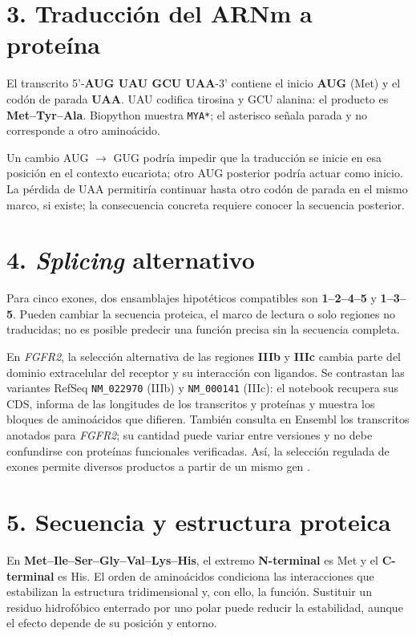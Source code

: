 \documentclass[10pt,a4paper]{article}
\begin{document}
\section*{3. Traducción del ARNm a proteína}
El transcrito 5'-\textbf{AUG UAU GCU UAA}-3' contiene el inicio \textbf{AUG} (Met) y el codón de parada \textbf{UAA}. UAU codifica tirosina y GCU alanina: el producto es \textbf{Met--Tyr--Ala}. Biopython muestra \texttt{MYA*}; el asterisco señala parada y no corresponde a otro aminoácido.

Un cambio AUG $\rightarrow$ GUG podría impedir que la traducción se inicie en esa posición en el contexto eucariota; otro AUG posterior podría actuar como inicio. La pérdida de UAA permitiría continuar hasta otro codón de parada en el mismo marco, si existe; la consecuencia concreta requiere conocer la secuencia posterior.

\section*{4. \textit{Splicing} alternativo}
Para cinco exones, dos ensamblajes hipotéticos compatibles son \textbf{1--2--4--5} y \textbf{1--3--5}. Pueden cambiar la secuencia proteica, el marco de lectura o solo regiones no traducidas; no es posible predecir una función precisa sin la secuencia completa.

En \textit{FGFR2}, la selección alternativa de las regiones \textbf{IIIb} y \textbf{IIIc} cambia parte del dominio extracelular del receptor y su interacción con ligandos. Se contrastan las variantes RefSeq \texttt{NM\_022970} (IIIb) y \texttt{NM\_000141} (IIIc): el notebook recupera sus CDS, informa de las longitudes de los transcritos y proteínas y muestra los bloques de aminoácidos que difieren. También consulta en Ensembl los transcritos anotados para \textit{FGFR2}; su cantidad puede variar entre versiones y no debe confundirse con proteínas funcionales verificadas. Así, la selección regulada de exones permite diversos productos a partir de un mismo gen \cite{ncbiFGFR2,ensembl}.

\section*{5. Secuencia y estructura proteica}
En \textbf{Met--Ile--Ser--Gly--Val--Lys--His}, el extremo \textbf{N-terminal} es Met y el \textbf{C-terminal} es His. El orden de aminoácidos condiciona las interacciones que estabilizan la estructura tridimensional y, con ello, la función. Sustituir un residuo hidrofóbico enterrado por uno polar puede reducir la estabilidad, aunque el efecto depende de su posición y entorno.
\end{document}
